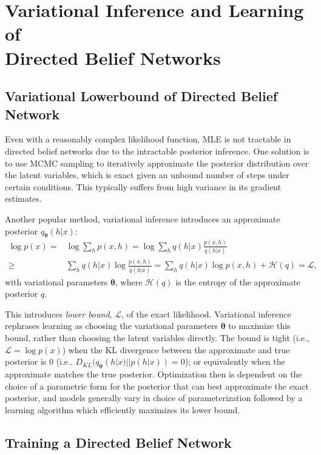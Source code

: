 \documentclass{article} %
\newcommand{\vects}[1]{\boldsymbol{#1}}
\newcommand{\TT}[0]{\vects{\theta}}
\newcommand{\LL}[0]{\mathcal{L}}
\newcommand{\HH}[0]{\mathcal{H}}
\begin{document}
\section{Variational Inference and Learning of \\ Directed Belief Networks}

\subsection{Variational Lowerbound of Directed Belief Network}

Even with a reasonably complex likelihood function, MLE is not tractable in
directed belief networks due to the intractable posterior inference.  One
solution is to use MCMC sampling to iteratively approximate the posterior
distribution over the latent variables, which is exact given an unbound number
of steps under certain conditions. This typically suffers from high variance in its
gradient estimates.

Another popular method, variational inference introduces an approximate
posterior $q_{\TT}(h|x)$:
\begin{align}
    \label{eq:approx_logp}
    \log p(x) =& \log \sum_{h} p(x, h) 
    = \log \sum_h q(h|x) \frac{p(x, h)}{q(h|x)} \nonumber \\
    \geq& \sum_h q(h|x) \log \frac{p(x, h)}{q(h|x)} 
    = \sum_h q(h|x) \log p(x,h) + \HH(q) = \LL,
\end{align}
with variational parameters $\TT$, where $\HH(q)$ is the entropy of the
approximate posterior $q$. 

This introduces \emph{lower bound}, $\LL$, of the exact likelihood. Variational
inference rephrases learning as choosing the variational parameters $\TT$ to
maximize this bound, rather than choosing the latent variables directly. The
bound is tight (i.e., $\LL = \log p(x)$) when the KL divergence between the
approximate and true posterior is $0$ (i.e., $D_{KL}(q_{\TT}(h|x)||p(h|x)) =
0$); or equivalently when the approximate matches the true posterior.
Optimization then is dependent on the choice of a parametric form for the
posterior that can best approximate the exact posterior, and models generally
vary in choice of parameterization followed by a learning algorithm which
efficiently maximizes its lower bound.

\subsection{Training a Directed Belief Network}
\end{document}
